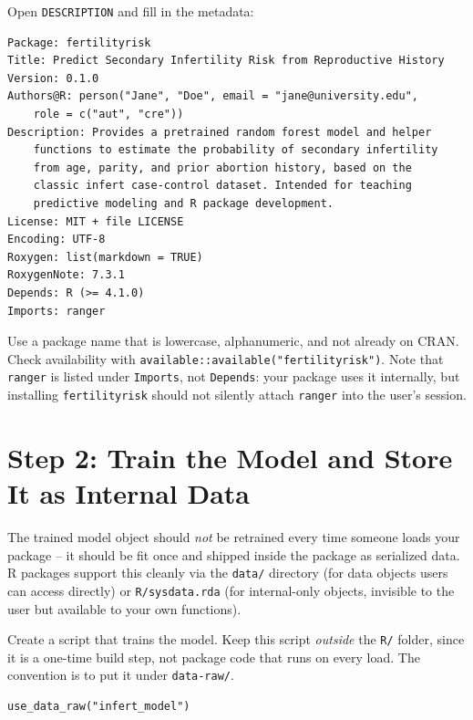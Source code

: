 \documentclass[11pt]{article}
\begin{document}
Open \texttt{DESCRIPTION} and fill in the metadata:

\begin{lstlisting}[language={}]
Package: fertilityrisk
Title: Predict Secondary Infertility Risk from Reproductive History
Version: 0.1.0
Authors@R: person("Jane", "Doe", email = "jane@university.edu",
    role = c("aut", "cre"))
Description: Provides a pretrained random forest model and helper
    functions to estimate the probability of secondary infertility
    from age, parity, and prior abortion history, based on the
    classic infert case-control dataset. Intended for teaching
    predictive modeling and R package development.
License: MIT + file LICENSE
Encoding: UTF-8
Roxygen: list(markdown = TRUE)
RoxygenNote: 7.3.1
Depends: R (>= 4.1.0)
Imports: ranger
\end{lstlisting}

\begin{tipbox}
Use a package name that is lowercase, alphanumeric, and not already on CRAN. Check availability with \texttt{available::available("fertilityrisk")}. Note that \texttt{ranger} is listed under \texttt{Imports}, not \texttt{Depends}: your package uses it internally, but installing \texttt{fertilityrisk} should not silently attach \texttt{ranger} into the user's session.
\end{tipbox}

\section{Step 2: Train the Model and Store It as Internal Data}

The trained model object should \emph{not} be retrained every time someone loads your package -- it should be fit once and shipped inside the package as serialized data. R packages support this cleanly via the \texttt{data/} directory (for data objects users can access directly) or \texttt{R/sysdata.rda} (for internal-only objects, invisible to the user but available to your own functions).

Create a script that trains the model. Keep this script \emph{outside} the \texttt{R/} folder, since it is a one-time build step, not package code that runs on every load. The convention is to put it under \texttt{data-raw/}.

\begin{lstlisting}
use_data_raw("infert_model")
\end{lstlisting}
\end{document}
